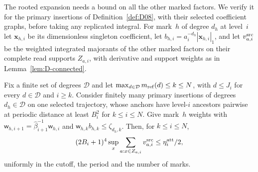 The rooted expansion needs a bound on all the other marked factors. We verify it for the primary insertions of Definition~\ref{def:D08}, with their selected coefficient graphs, before taking any replicated integral. For mark~$h$ of degree $d_h$ at level~$i$ let $\mathbf x_{h,i}$ be its dimensionless singleton coefficient, let $b_{h,i}=a_i^{-d_h}|\mathbf x_{h,i}|_1$, and let $v_{a,i}^{\rm src}$ be the weighted integrated majorants of the other marked factors on their complete read supports $Z_{a,i}$, with derivative and support weights as in Lemma~\ref{lem:D-connected}.
\begin{lemma}\label{lem:E-source-attachments}
Fix a finite set of degrees $\mathcal D$ and let $\max_{d\in\mathcal D}m_{\mathrm{ref}}(d)\le k\le N$, with $d\le J_i$ for every $d\in\mathcal D$ and $i\ge k$. Consider finitely many primary insertions of degrees $d_h\in\mathcal D$ on one selected trajectory, whose anchors have level-$i$ ancestors pairwise at periodic distance at least $B_i^2$ for $k\le i\le N$. Give mark~$h$ weights with $\mathsf w_{h,i+1}=\widehat\beta_{i+1}^{-1}\mathsf w_{h,i}$ and $\mathsf w_{h,k}b_{h,k}\le\zeta_{d_h,k}$. Then, for $k\le i\le N$,
\begin{equation*}
 (2B_i+1)^4\sup_x\sum_{a:x\in Z_{a,i}}v_{a,i}^{\rm src}\le\eta^{\rm att}_i/2,
\end{equation*}
uniformly in the cutoff, the period and the number of marks.
\end{lemma}
